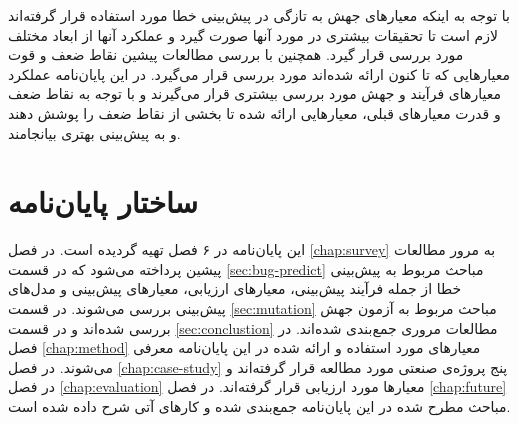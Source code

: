 با توجه به اینکه معیارهای جهش به تازگی در پیش‌بینی خطا مورد استفاده قرار گرفته‌اند لازم است تا تحقیقات بیشتری در مورد آنها صورت گیرد و عملکرد آنها از ابعاد مختلف مورد بررسی قرار گیرد. همچنین با بررسی مطالعات پیشین نقاط ضعف و قوت معیارهایی که تا کنون ارائه شده‌اند مورد بررسی قرار می‌گیرد. در این پایان‌نامه عملکرد معیارهای فرآیند و جهش مورد بررسی بیشتری قرار می‌گیرند و با توجه به نقاط ضعف و قدرت معیارهای قبلی، معیارهایی ارائه شده تا بخشی از نقاط ضعف را پوشش دهند و به پیش‌بینی بهتری بیانجامند. 
\section{ساختار پایان‌نامه}

این پایان‌نامه در ۶ فصل تهیه گردیده است. در فصل \ref{chap:survey} به مرور مطالعات پیشین پرداخته می‌شود که در  قسمت \ref{sec:bug-predict}  مباحث مربوط به پیش‌بینی خطا از جمله فرآیند پیش‌بینی، معیارهای ارزیابی، معیارهای پیش‌بینی و مدل‌های پیش‌بینی بررسی می‌شوند. در قسمت \ref{sec:mutation} مباحث مربوط به آزمون جهش بررسی شده‌اند و در قسمت \ref{sec:conclustion} مطالعات مروری جمع‌بندی شده‌اند. در فصل \ref{chap:method} معیارهای مورد استفاده و ارائه شده در این پایان‌نامه معرفی می‌شوند. در فصل \ref{chap:case-study} پنج پروژه‌ی صنعتی مورد مطالعه قرار گرفته‌اند و در فصل \ref{chap:evaluation} معیارها مورد ارزیابی قرار گرفته‌اند. در فصل \ref{chap:future} مباحث مطرح شده در این پایان‌نامه جمع‌بندی شده و کارهای آتی شرح داده شده است. 
	
